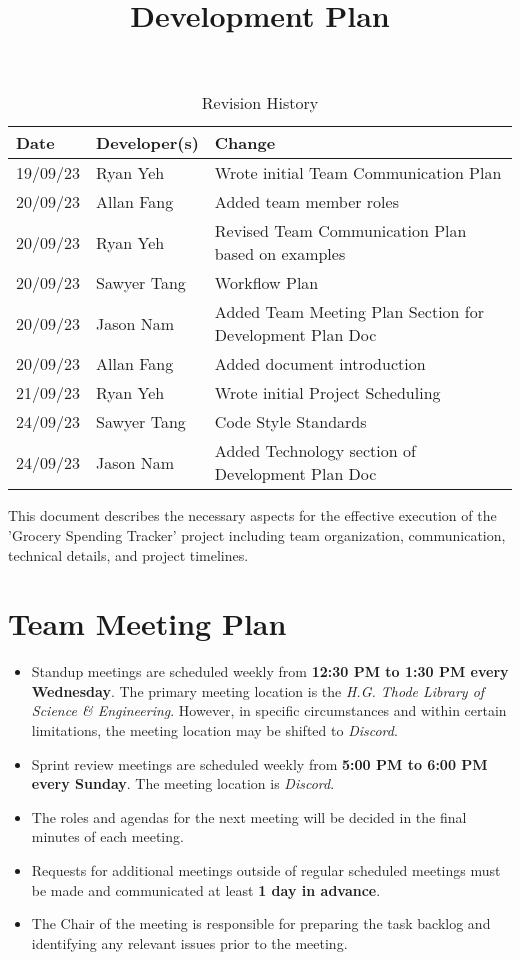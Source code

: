 \documentclass{article}
\title{Development Plan\\\progname}
\author{\authname}
\date{}
\begin{document}
\maketitle

\begin{table}[hp]
\caption{Revision History} \label{TblRevisionHistory}
\begin{tabularx}{\textwidth}{llX}
\toprule
\textbf{Date} & \textbf{Developer(s)} & \textbf{Change}\\
\midrule
19/09/23 & Ryan Yeh & Wrote initial Team Communication Plan\\
20/09/23 & Allan Fang & Added team member roles\\
20/09/23 & Ryan Yeh & Revised Team Communication Plan based on examples\\
20/09/23 & Sawyer Tang & Workflow Plan\\
20/09/23 & Jason Nam & Added Team Meeting Plan Section for Development Plan Doc\\
20/09/23 & Allan Fang & Added document introduction\\
21/09/23 & Ryan Yeh & Wrote initial Project Scheduling\\
24/09/23 & Sawyer Tang & Code Style Standards\\
24/09/23 & Jason Nam & Added Technology section of Development Plan Doc\\
\bottomrule
\end{tabularx}
\end{table}

This document describes the necessary aspects for the effective execution of the 'Grocery Spending Tracker' project including team organization, communication, technical details, and project timelines.

\section{Team Meeting Plan}

\begin{itemize}
	\item Standup meetings are scheduled weekly from \textbf{12:30 PM to 1:30 PM every Wednesday}. The primary meeting location is the \emph{H.G. Thode Library of Science \& Engineering}. However, in specific circumstances and within certain limitations, the meeting location may be shifted to \emph{Discord}.
    	\item Sprint review meetings are scheduled weekly from \textbf{5:00 PM to 6:00 PM every Sunday}. The meeting location is \emph{Discord}.
    	\item The roles and agendas for the next meeting will be decided in the final minutes of each meeting.
    	\item Requests for additional meetings outside of regular scheduled meetings must be made and communicated at least \textbf{1 day in advance}.
   	\item The Chair of the meeting is responsible for preparing the task backlog and identifying any relevant issues prior to the meeting.
\end{itemize}
\end{document}
